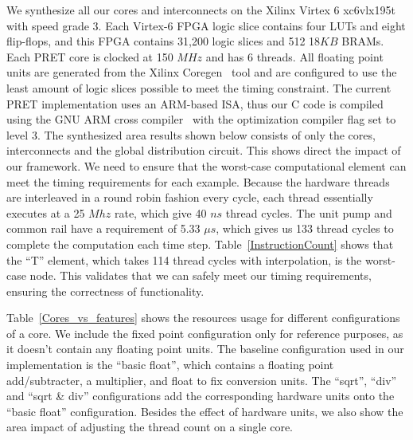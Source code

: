 
We synthesize all our cores and interconnects on the Xilinx Virtex 6 xc6vlx195t~\cite{v6_manual} with speed grade 3.
Each Virtex-6 FPGA logic slice contains four LUTs and eight flip-flops, and this FPGA contains 31,200 logic slices and 512 18$KB$ BRAMs.
Each PRET core is clocked at 150 $MHz$ and has 6 threads.
All floating point units are generated from the Xilinx Coregen~\cite{xilinx_coregen} tool and are configured to use the least amount of logic slices possible to meet the timing constraint. 
The current PRET implementation uses an ARM-based ISA, thus our C code is compiled using the GNU ARM cross compiler~\cite{gnu-arm} with the optimization compiler flag set to level 3.  
The synthesized area results shown below consists of only the cores, interconnects and the global distribution circuit. 
This shows direct the impact of our framework.  
We need to ensure that the worst-case computational element can meet the timing requirements for each example.
Because the hardware threads are interleaved in a round robin fashion every cycle, each thread essentially executes at a 25 $Mhz$ rate, which give 40 $ns$ thread cycles. 
The unit pump and common rail have a requirement of 5.33 \(\mu s\), which gives us 133 thread cycles to complete the computation each time step. 
Table~\ref{InstructionCount} shows that the ``T'' element, which takes 114 thread cycles with interpolation, is the worst-case node. 
This validates that we can safely meet our timing requirements, ensuring the correctness of functionality.   

Table~\ref{Cores_vs_features} shows the resources usage for different configurations of a core.
We include the fixed point configuration only for reference purposes, as it doesn't contain any floating point units.
The baseline configuration used in our implementation is the ``basic float'', which contains a floating point add/subtracter, a multiplier, and float to fix conversion units.
The ``sqrt'', ``div'' and ``sqrt \& div'' configurations add the corresponding hardware units onto the ``basic float'' configuration. 
Besides the effect of hardware units, we also show the area impact of adjusting the thread count on a single core.

